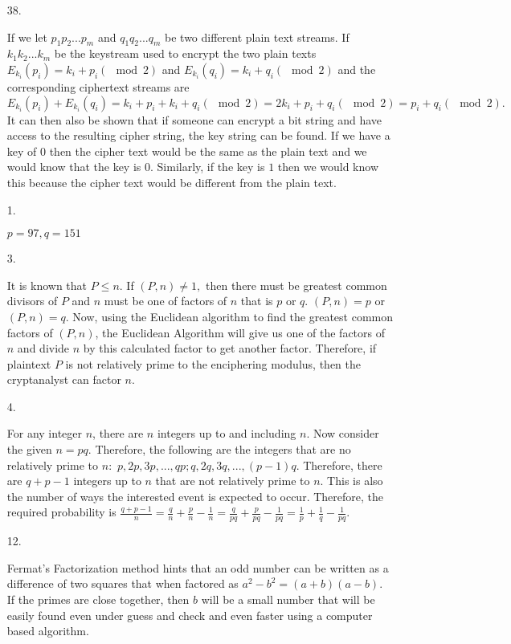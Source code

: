 \documentclass{article}
\theoremstyle{definition}
\begin{document}
\begin{enumerate}
    \item [38. ]
    
    If we let $p_1p_2...p_m$ and $q_1q_2...q_m$ be two different plain text streams. If $k_1k_2...k_m$ be the keystream used to encrypt the two plain texts $E_{k_i}(p_i) = k_i + p_i(\mod 2)$ and $E_{k_i}(q_i) = k_i + q_i(\mod 2)$ and the corresponding ciphertext streams are $E_{k_i}(p_i) + E_{k_i}(q_i) = k_i + p_i + k_i + q_i(\mod 2) = 2k_i + p_i + q_i (\mod 2) = p_i + q_i(\mod 2).$ It can then also be shown that if someone can encrypt a bit string and have access to the resulting cipher string, the key string can be found. If we have a key of $0$ then the cipher text would be the same as the plain text and we would know that the key is $0$. Similarly, if the key is $1$ then we would know this because the cipher text would be different from the plain text.
    
    \item [1. ]
    
    $p = 97, q = 151$
    
    \item [3. ]
    
    It is known that $P \leq n$. If $(P, n) \neq 1,$ then there must be greatest common divisors of $P$ and $n$ must be one of factors of $n$ that is $p$ or $q$. $(P, n) = p$ or $(P, n) = q$. Now, using the Euclidean algorithm to find the greatest common factors of $(P, n)$, the Euclidean Algorithm will give us one of the factors of $n$ and divide $n$ by this calculated factor to get another factor. Therefore, if plaintext $P$ is not relatively prime to the enciphering modulus, then the cryptanalyst can factor $n.$
    
    \item [4. ]
    
    For any integer $n$, there are $n$ integers up to and including $n.$ Now consider the given $n = pq$. Therefore, the following are the integers that are no relatively prime to $n:$ $p, 2p, 3p, ..., qp; q, 2q, 3q, ..., (p-1)q.$ Therefore, there are $q + p - 1$ integers up to $n$ that are not relatively prime to $n.$ This is also the number of ways the interested event is expected to occur. Therefore, the required probability is $\frac{q+p-1}{n} = \frac{q}{n} + \frac{p}{n}-\frac{1}{n} = \frac{q}{pq} + \frac{p}{pq} - \frac{1}{pq} = \frac{1}{p} + \frac{1}{q} - \frac{1}{pq}.$
    
    \item [12. ]
    
    Fermat's Factorization method hints that an odd number can be written as a difference of two squares that when factored as $a^2-b^2 = (a+b)(a-b)$. If the primes are close together, then $b$ will be a small number that will be easily found even under guess and check and even faster using a computer based algorithm.
    

\end{enumerate}
\end{document}
